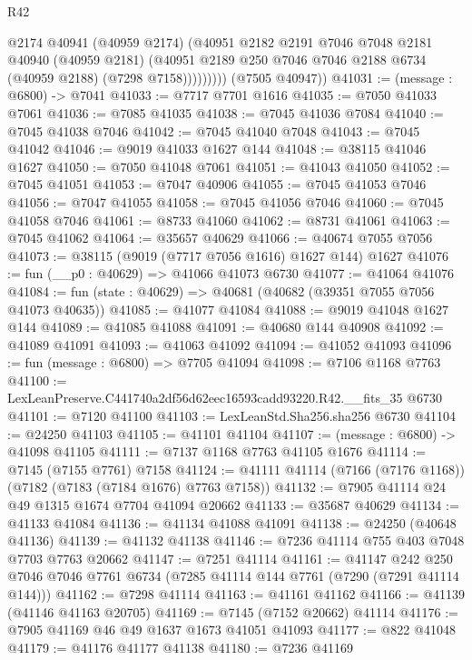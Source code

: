 \begin{lexlean}{R42}
\begin{coremodule}
{                  @2174
                  @40941
                  (@40959 @2174)
                  (@40951
                    @2182
                    @2191
                    @7046
                    @7048
                    @2181
                    @40940
                    (@40959 @2181)
                    (@40951 @2189 @250 @7046 @7046 @2188 @6734 (@40959 @2188) (@7298 @7158)))))))))
      (@7505 @40947))
@41031 := (message : @6800) -> @7041
@41033 := @7717 @7701 @1616
@41035 := @7050 @41033 @7061
@41036 := @7085 @41035
@41038 := @7045 @41036 @7084
@41040 := @7045 @41038 @7046
@41042 := @7045 @41040 @7048
@41043 := @7045 @41042
@41046 := @9019 @41033 @1627 @144
@41048 := @38115 @41046 @1627
@41050 := @7050 @41048 @7061
@41051 := @41043 @41050
@41052 := @7045 @41051
@41053 := @7047 @40906
@41055 := @7045 @41053 @7046
@41056 := @7047 @41055
@41058 := @7045 @41056 @7046
@41060 := @7045 @41058 @7046
@41061 := @8733 @41060
@41062 := @8731 @41061
@41063 := @7045 @41062
@41064 := @35657 @40629
@41066 := @40674 @7055 @7056
@41073 := @38115 (@9019 (@7717 @7056 @1616) @1627 @144) @1627
@41076 := fun (__p0 : @40629) => @41066 @41073 @6730
@41077 := @41064 @41076
@41084 := fun (state : @40629) => @40681 (@40682 (@39351 @7055 @7056 @41073 @40635))
@41085 := @41077 @41084
@41088 := @9019 @41048 @1627 @144
@41089 := @41085 @41088
@41091 := @40680 @144 @40908
@41092 := @41089 @41091
@41093 := @41063 @41092
@41094 := @41052 @41093
@41096 := fun (message : @6800) => @7705 @41094
@41098 := @7106 @1168 @7763
@41100 := LexLeanPreserve.C441740a2df56d62eec16593cadd93220.R42.__fits_35 @6730
@41101 := @7120 @41100
@41103 := LexLeanStd.Sha256.sha256 @6730
@41104 := @24250 @41103
@41105 := @41101 @41104
@41107 := (message : @6800) -> @41098 @41105
@41111 := @7137 @1168 @7763 @41105 @1676
@41114 := @7145 (@7155 @7761) @7158
@41124 := @41111 @41114 (@7166 (@7176 @1168)) (@7182 (@7183 (@7184 @1676) @7763 @7158))
@41132 := @7905 @41114 @24 @49 @1315 @1674 @7704 @41094 @20662
@41133 := @35687 @40629
@41134 := @41133 @41084
@41136 := @41134 @41088 @41091
@41138 := @24250 (@40648 @41136)
@41139 := @41132 @41138
@41146 := @7236 @41114 @755 @403 @7048 @7703 @7763 @20662
@41147 := @7251 @41114
@41161 := @41147
    @242
    @250
    @7046
    @7046
    @7761
    @6734
    (@7285 @41114 @144 @7761 (@7290 (@7291 @41114 @144)))
@41162 := @7298 @41114
@41163 := @41161 @41162
@41166 := @41139 (@41146 @41163 @20705)
@41169 := @7145 (@7152 @20662) @41114
@41176 := @7905 @41169 @46 @49 @1637 @1673 @41051 @41093
@41177 := @822 @41048
@41179 := @41176 @41177 @41138
@41180 := @7236 @41169
}
\end{coremodule}
\end{lexlean}
